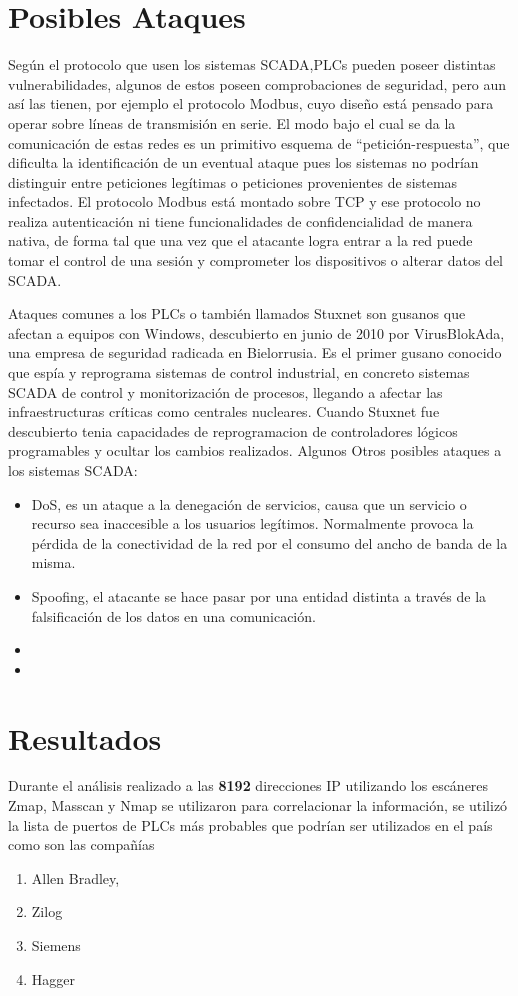 \documentclass[jou]{apa6}   %
\begin{document}
\section{Posibles Ataques}
Según el protocolo que usen los sistemas SCADA,PLCs pueden poseer distintas vulnerabilidades, algunos de estos poseen comprobaciones de seguridad, pero aun así las tienen, por ejemplo el protocolo Modbus, cuyo diseño está pensado para operar sobre líneas de transmisión en serie. El modo bajo el cual se da la comunicación de estas redes es un primitivo esquema de “petición-respuesta”, que dificulta la identificación de un eventual ataque pues los sistemas no podrían distinguir entre peticiones legítimas o peticiones provenientes de sistemas infectados. El protocolo Modbus está montado sobre TCP y ese protocolo no realiza autenticación ni tiene funcionalidades de confidencialidad de manera nativa, de forma tal que una vez que el atacante logra entrar a la red puede tomar el control de una sesión y comprometer los dispositivos o alterar datos del SCADA.

Ataques comunes a los PLCs o también llamados Stuxnet son gusanos que afectan a equipos con Windows, descubierto en junio de 2010 por VirusBlokAda, una empresa de seguridad radicada en Bielorrusia. Es el primer gusano conocido que espía y reprograma sistemas de control industrial, en concreto sistemas SCADA de control y monitorización de procesos, llegando a afectar las infraestructuras críticas como centrales nucleares.
Cuando Stuxnet fue descubierto tenia capacidades de reprogramacion de controladores lógicos programables y ocultar los cambios realizados. 
Algunos Otros posibles ataques a los sistemas SCADA:
\begin{itemize}
\item DoS, es un ataque a la denegación de servicios, causa que un servicio o recurso sea inaccesible a los usuarios legítimos. Normalmente provoca la pérdida de la conectividad de la red por el consumo del ancho de banda de la misma.
\item Spoofing, el atacante se hace pasar por una entidad distinta a través de la falsificación de los datos en una comunicación.
\item 
\item 
\end{itemize}

\section{Resultados }
Durante el análisis realizado a las \textbf{8192} direcciones IP utilizando los escáneres Zmap, Masscan y Nmap se utilizaron para  correlacionar la información, se utilizó la lista de puertos de PLCs más probables que podrían ser utilizados en el país como son las compañías
\begin{enumerate}
\item Allen Bradley,
\item Zilog
\item Siemens
\item Hagger
\end{enumerate}
\end{document}
